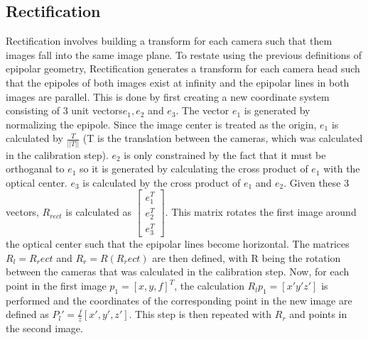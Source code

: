 \subsection{Rectification}
Rectification involves building a transform for each camera such that them images fall into the same image plane.  To restate using the previous definitions of epipolar geometry, Rectification generates a transform for each camera head such that the epipoles of both images exist at infinity and the epipolar lines in both images are parallel.  This is done by first creating a new coordinate system consisting of 3 unit vectors$e_1, e_2$ and $e_3$. The vector $e_1$ is generated by normalizing the epipole.  Since the image center is treated as the origin, $e_1$ is calculated by $\frac{T}{||T||}$ (T is the translation between the cameras, which was calculated in the calibration step).  $e_2$ is only constrained by the fact that it must be orthoganal to $e_1$ so it is generated by calculating the cross product of $e_1$ with the optical center.  $e_3$ is calculated by the cross product of $e_1$ and $e_2$.  Given these 3 vectors, $R_{rect}$ is calculated as $\begin{bmatrix} e_1^T \\ e_2^T \\ e_3^T \end{bmatrix}$.  This matrix rotates the first image around the optical center such that the epipolar lines become horizontal.  The matrices $R_l= R_rect$ and $R_r = R(R_rect)$ are then defined, with R being the rotation between the cameras that was calculated in the calibration step.  Now, for each point in the first image $p_1 = [x, y, f]^T$, the calculation $R_lp_1 = [x'y'z']$ is performed and the coordinates of the corresponding point in the new image are defined as $P_l' = \frac{f}{z}[x',y',z']$.  This step is then repeated with $R_r$ and points in the second image.


